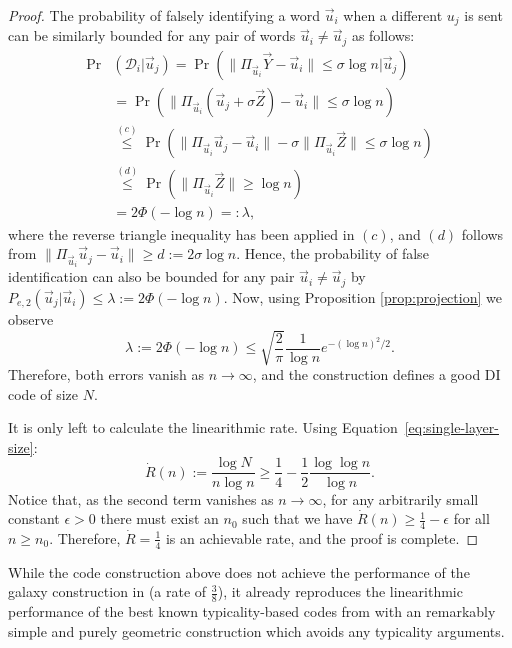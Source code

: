 \documentclass[10pt,conference]{IEEEtran}
\newcommand{\1}{\mathds{1}}
\newcommand{\cD}{\mathcal{D}}
\begin{document}
\begin{proof}
The probability of falsely identifying a word $\vec u_i$ when a different $u_j$ is sent can be similarly bounded for any pair of words $\vec{u}_i\neq\vec{u}_j$ as follows:
\begin{equation}\label{eq:Proj_error2}
\begin{split}
\Pr&(\cD_i|\vec{u}_j)=\Pr\left(\|\Pi_{\vec{u}_i}\vec{Y}-\vec{u}_i\|\leq\sigma\log n|\vec{u}_j\right)\\
&=\Pr\left(\|\Pi_{\vec{u}_i}(\vec{u}_j+\sigma\vec{Z})-\vec{u}_i\|\leq\sigma\log n\right)\\
&\stackrel{(c)}{\leq}\Pr\left(\|\Pi_{\vec{u}_i}\vec{u}_j-\vec{u}_i\|-\sigma\|\Pi_{\vec{u}_i}\vec{Z}\|\leq\sigma\log n\right)\\
&\stackrel{(d)}{\leq}\Pr\left(\|\Pi_{\vec{u}_i}\vec{Z}\|\geq\log n\right)\\
&=2\Phi(-\log n)=:\lambda,
\end{split}
\end{equation}
where the reverse triangle inequality has been applied in $(c)$, and $(d)$ follows from $\|\Pi_{\vec{u}_i}\vec{u}_j-\vec{u}_i\|\geq d:=2\sigma\log n$. Hence, the probability of false identification can also be bounded for any pair $\vec{u}_i\neq\vec{u}_j$ by 
\(P_{e,2}(\vec{u}_j|\vec{u}_i)\leq\lambda:=2\Phi(-\log n)\).
Now, using Proposition \ref{prop:projection} we observe
\begin{equation}
\lambda:=2\Phi(-\log n)\leq \sqrt{\frac{2}{\pi}}\frac{1}{\log n}e^{-(\log n)^2/2}.
\end{equation}
Therefore, both errors vanish as $n\to\infty$, and the construction defines a good DI code of size $N$. 

It is only left to calculate the linearithmic rate. Using Equation~\eqref{eq:single-layer-size}:
\begin{equation}\label{eq:R_example1}
\dot{R}(n):=\frac{\log N}{n\log n}\geq\frac{1}{4}-\frac12\frac{\log\log n}{\log n}.
\end{equation}
Notice that, as the second term vanishes as $n\to\infty$, for any arbitrarily small constant $\epsilon>0$ there must exist an $n_0$ such that we have $\dot R(n)\geq \frac14-\epsilon$ for all $n\ge n_0$. Therefore, $\dot{R}=\frac14$ is an achievable rate, and the proof is complete.
\end{proof}

While the code construction above does not achieve the performance of the galaxy construction in \cite{galaxy-codes} (a rate of $\frac38$), it already reproduces the linearithmic performance of the best known typicality-based codes from \cite{DI-fading,RRGauss-arXiv} with an remarkably simple and purely geometric construction which avoids any typicality arguments. 
\end{document}
